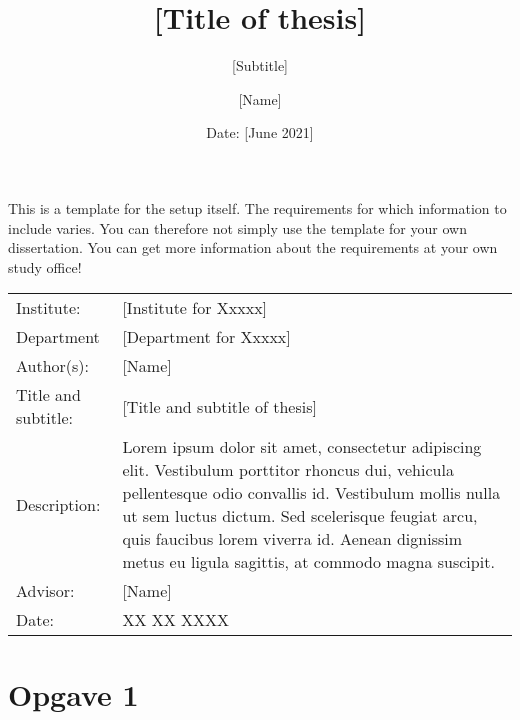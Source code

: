 \documentclass[12pt]{article}
\author{[Name]}
\title{[Title of thesis]}
\subtitle{[Subtitle]}
\date{Date: {[June 2021]}}
\begin{document}
\maketitle

\onehalfspacing

\noindent This is a template for the setup itself. The requirements for which information to include varies. You can therefore not simply use the template for your own dissertation. You can get more information about the requirements at your own study office!
\begin{table}[h]
\def\arraystretch{1.5}
\begin{tabularx}{\textwidth}{l X}
Institute: & {[Institute for Xxxxx]}  \\
Department & {[Department for Xxxxx]} \\
Author(s): & {[Name]} \\
Title and subtitle: & {[Title and subtitle of thesis]} \\
Description: & Lorem ipsum dolor sit amet, consectetur adipiscing elit. Vestibulum porttitor rhoncus dui, vehicula pellentesque odio convallis id. Vestibulum mollis nulla ut sem luctus dictum. Sed scelerisque feugiat arcu, quis faucibus lorem viverra id. Aenean dignissim metus eu ligula sagittis, at commodo magna suscipit. \\
Advisor: & {[Name]} \\
Date: & XX XX XXXX
\end{tabularx}
\end{table}
\newpage

\tableofcontents
\newpage

{\selectfont


\section{Opgave 1}




}
\end{document}
